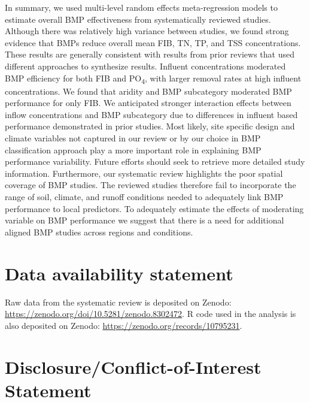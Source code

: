 \documentclass[utf8]{FrontiersinHarvard}
\begin{document}
In summary, we used multi-level random effects meta-regression models to estimate overall BMP effectiveness from systematically reviewed studies.
Although there was relatively high variance between studies, we found strong evidence that BMPs reduce overall mean FIB, TN, TP, and TSS concentrations.
These results are generally consistent with results from prior reviews that used different approaches to synthesize results.
Influent concentrations moderated BMP efficiency for both FIB and PO\textsubscript{4}, with larger removal rates at high influent concentrations.
We found that aridity and BMP subcategory moderated BMP performance for only FIB.
We anticipated stronger interaction effects between inflow concentrations and BMP subcategory due to differences in influent based performance demonstrated in prior studies.
Most likely, site specific design and climate variables not captured in our review or by our choice in BMP classification approach play a more important role in explaining BMP performance variability.
Future efforts should seek to retrieve more detailed study information.
Furthermore, our systematic review highlights the poor spatial coverage of BMP studies.
The reviewed studies therefore fail to incorporate the range of soil, climate, and runoff conditions needed to adequately link BMP performance to local predictors.
To adequately estimate the effects of moderating variable on BMP performance we suggest that there is a need for additional aligned BMP studies across regions and conditions.

\hypertarget{data-availability-statement}{%
\section*{Data availability statement}\label{data-availability-statement}}

Raw data from the systematic review is deposited on Zenodo: \url{https://zenodo.org/doi/10.5281/zenodo.8302472}.
R code used in the analysis is also deposited on Zenodo: \url{https://zenodo.org/records/10795231}.

\hypertarget{disclosureconflict-of-interest-statement}{%
\section*{Disclosure/Conflict-of-Interest Statement}\label{disclosureconflict-of-interest-statement}}
\end{document}
